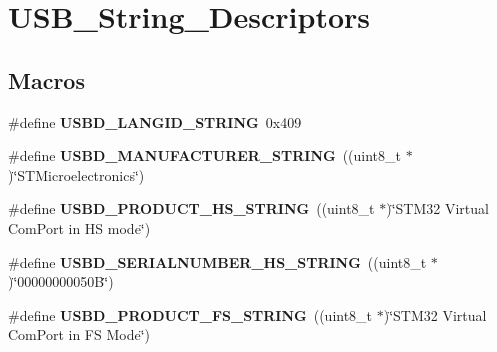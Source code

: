 \hypertarget{group__USB__String__Descriptors}{\section{U\-S\-B\-\_\-\-String\-\_\-\-Descriptors}
\label{group__USB__String__Descriptors}
}
\subsection*{Macros}
\begin{DoxyCompactItemize}
\item 
\hypertarget{group__USB__String__Descriptors_ga070dd542d4d914e86fdf103fa5fdd72f}{\#define {\bfseries U\-S\-B\-D\-\_\-\-L\-A\-N\-G\-I\-D\-\_\-\-S\-T\-R\-I\-N\-G}~0x409}\label{group__USB__String__Descriptors_ga070dd542d4d914e86fdf103fa5fdd72f}

\item 
\hypertarget{group__USB__String__Descriptors_gaee0c9fd7e8265b90126028919cd863a6}{\#define {\bfseries U\-S\-B\-D\-\_\-\-M\-A\-N\-U\-F\-A\-C\-T\-U\-R\-E\-R\-\_\-\-S\-T\-R\-I\-N\-G}~((uint8\-\_\-t $\ast$)\char`\"{}S\-T\-Microelectronics\char`\"{})}\label{group__USB__String__Descriptors_gaee0c9fd7e8265b90126028919cd863a6}

\item 
\hypertarget{group__USB__String__Descriptors_gaae2eb6ae86923f00a81532b4eb236819}{\#define {\bfseries U\-S\-B\-D\-\_\-\-P\-R\-O\-D\-U\-C\-T\-\_\-\-H\-S\-\_\-\-S\-T\-R\-I\-N\-G}~((uint8\-\_\-t $\ast$)\char`\"{}S\-T\-M32 Virtual Com\-Port in H\-S mode\char`\"{})}\label{group__USB__String__Descriptors_gaae2eb6ae86923f00a81532b4eb236819}

\item 
\hypertarget{group__USB__String__Descriptors_ga74b2daad6b8f302ec584966776175e30}{\#define {\bfseries U\-S\-B\-D\-\_\-\-S\-E\-R\-I\-A\-L\-N\-U\-M\-B\-E\-R\-\_\-\-H\-S\-\_\-\-S\-T\-R\-I\-N\-G}~((uint8\-\_\-t $\ast$)\char`\"{}00000000050\-B\char`\"{})}\label{group__USB__String__Descriptors_ga74b2daad6b8f302ec584966776175e30}

\item 
\hypertarget{group__USB__String__Descriptors_ga7cac702718063f4c3574ea1d442136b1}{\#define {\bfseries U\-S\-B\-D\-\_\-\-P\-R\-O\-D\-U\-C\-T\-\_\-\-F\-S\-\_\-\-S\-T\-R\-I\-N\-G}~((uint8\-\_\-t $\ast$)\char`\"{}S\-T\-M32 Virtual Com\-Port in F\-S Mode\char`\"{})}\label{group__USB__String__Descriptors_ga7cac702718063f4c3574ea1d442136b1}


\end{DoxyCompactItemize}
